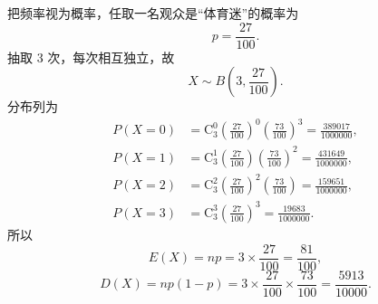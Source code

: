 \begin{answer}
把频率视为概率，任取一名观众是“体育迷”的概率为
\nopagebreak[4]
\[p=\frac{27}{100}.\]
抽取 3 次，每次相互独立，故
\nopagebreak[4]
\[X\sim B\left(3,\frac{27}{100}\right).\]
分布列为
\nopagebreak[4]
\[\begin{aligned}
P(X=0)&=\mathrm C_3^0\left(\frac{27}{100}\right)^0\left(\frac{73}{100}\right)^3
=\frac{389017}{1000000},\\
P(X=1)&=\mathrm C_3^1\left(\frac{27}{100}\right)\left(\frac{73}{100}\right)^2
=\frac{431649}{1000000},\\
P(X=2)&=\mathrm C_3^2\left(\frac{27}{100}\right)^2\left(\frac{73}{100}\right)
=\frac{159651}{1000000},\\
P(X=3)&=\mathrm C_3^3\left(\frac{27}{100}\right)^3
=\frac{19683}{1000000}.
\end{aligned}\]
所以
\nopagebreak[4]
\[E(X)=np=3\times\frac{27}{100}=\frac{81}{100},\]
\nopagebreak[4]
\[D(X)=np(1-p)=3\times\frac{27}{100}\times\frac{73}{100}
=\frac{5913}{10000}.\]



\end{answer}
